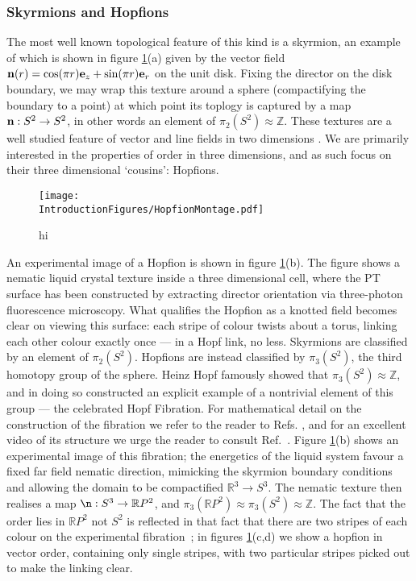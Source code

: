 \subsubsection{Skyrmions and Hopfions}
The most well known topological feature of this kind is a skyrmion, an example of which is shown in figure \ref{fig:HopfionMontage}(a) given by the vector field ${\bf n}(r) = \cos(\pi r) {\bf e}_z + \sin(\pi r) {\bf e}_r$ on the unit disk. Fixing the director on the disk boundary, we may wrap this texture around a sphere (compactifying the boundary to a point) at which point its toplogy is captured by a map ${\bf n} : S^2 \rightarrow S^2$, in other words an element of $\pi_2 (S^2)\approx \mathbb{Z}$. These textures are a well studied feature of vector and line fields in two dimensions \citep{AlexanderBook}. We are primarily interested in the properties of order in three dimensions, and as such focus on their three dimensional `cousins': Hopfions.
\begin{figure}[htbp]
\centering
\texttt{[image: \\IntroductionFigures/HopfionMontage.pdf]}
\caption{hi }
\label{fig:HopfionMontage}
\end{figure}
An experimental image of a Hopfion is shown in figure \ref{fig:HopfionMontage}(b)\citep{ChenThesis,Chen2013}. The figure shows a nematic liquid crystal texture inside a three dimensional cell, where the PT surface has been constructed by extracting director orientation via three-photon fluorescence microscopy. What qualifies the Hopfion as a knotted field becomes clear on viewing this surface: each stripe of colour twists about a torus, linking each other colour exactly once --- in a Hopf link, no less. Skyrmions are classified by an element of $\pi_2(S^2)$. Hopfions are instead classified by $\pi_3(S^2)$, the third homotopy group of the sphere. Heinz Hopf famously showed that $\pi_3(S^2) \approx \mathbb{Z}$, and in doing so constructed an explicit example of a nontrivial element of this group --- the celebrated Hopf Fibration. For mathematical detail on the construction of the fibration we refer to the reader to Refs. \citep{AlexanderBook,BottTuBook}, and for an excellent video of its structure we urge the reader to consult Ref.~\citep{Johnson2011}. Figure \ref{fig:HopfionMontage}(b) shows an experimental image of this fibration; the energetics of the liquid system favour a fixed far field nematic direction, mimicking the skyrmion boundary conditions and allowing the domain to be compactified $\mathbb{R}^3\rightarrow {S}^3$. The nematic texture then realises a map $\n: S^3 \rightarrow \mathbb{R}P^2$, and $\pi_3(\mathbb{R}P^2) \approx \pi_3(S^2) \approx \mathbb{Z}$. The fact that the order lies in $\mathbb{R}P^2$ not $S^2$ is reflected in that fact that there are two stripes of each colour on the experimental fibration~\citep{Chen2013,Ackerman2017}; in figures \ref{fig:HopfionMontage}(c,d) we show a hopfion in vector order, containing only single stripes, with two particular stripes picked out to make the linking clear.
